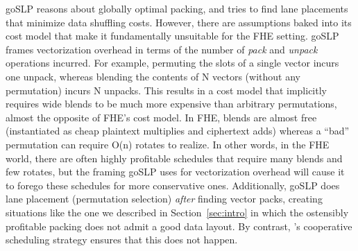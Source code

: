 goSLP \cite{goSLP} reasons about globally optimal packing, and tries to find lane placements that minimize data shuffling costs. 
However, there are assumptions baked into its cost model that make it fundamentally unsuitable for the FHE setting.
goSLP frames vectorization overhead in terms of the number of {\em pack} and {\em unpack} operations incurred.
For example, permuting the slots of a single vector incurs one unpack, whereas blending the contents of N vectors (without any permutation) incurs N unpacks.
This results in a cost model that implicitly requires wide blends to be much more expensive than arbitrary permutations, almost the opposite of FHE's cost model. In FHE, blends are almost free (instantiated as cheap plaintext multiplies and ciphertext adds) whereas a ``bad'' permutation can require O(n) rotates to realize.
In other words, in the FHE world, there are often highly profitable schedules that require many blends and few rotates, but the framing goSLP uses for vectorization overhead will cause it to forego these schedules for more conservative ones.
Additionally, goSLP does lane placement (permutation selection) {\em after} finding vector packs, creating situations like the one we described in Section~\ref{sec:intro} in which the ostensibly profitable packing does not admit a good data layout.
By contrast, \system's cooperative scheduling strategy ensures that this does not happen.


